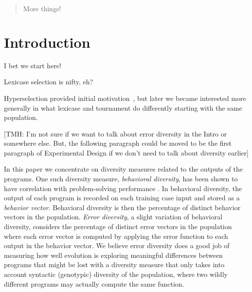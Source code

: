\documentclass{sig-alternate-05-2015}
\begin{document}
\maketitle
\begin{abstract}
More things!
\end{abstract}

%
%
\printccsdesc



\section{Introduction}
\label{sec:introduction}

I bet we start here!

Lexicase selection \cite{Spector:2012:GECCOcompANEW} is nifty, eh?

Hyperselection provided initial motivation~\cite{Helmuth:2016:GECCO}, but later we became interested more generally in what lexicase and tournament do differently starting with the same population.

[TMH: I'm not sure if we want to talk about error diversity in the Intro or somewhere else. But, the following paragraph could be moved to be the first paragraph of Experimental Design if we don't need to talk about diversity earlier]

In this paper we concentrate on diversity measures related to the outputs of the programs. One such diversity measure, \textit{behavioral diversity}, has been shown to have correlation with problem-solving performance \cite{Jackson:2010:PPSN}. In behavioral diversity, the output of each program is recorded on each training case input and stored as a \textit{behavior vector}. Behavioral diversity is then the percentage of distinct behavior vectors in the population. \textit{Error diversity}, a slight variation of behavioral diversity, considers the percentage of distinct error vectors in the population where each error vector is computed by applying the error function to each output in the behavior vector. We believe error diversity does a good job of measuring how well evolution is exploring meaningful differences between programs that might be lost with a diversity measure that only takes into account syntactic (genotypic) diversity of the population, where two wildly different programs may actually compute the same function.
\end{document}
